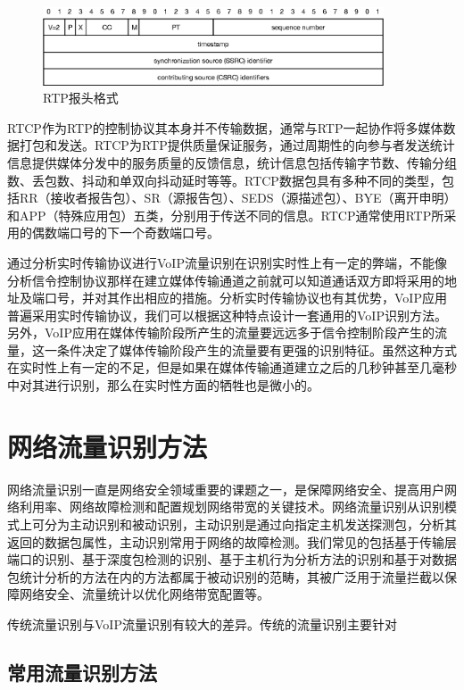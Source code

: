 \begin{figure}[thb]
\begin{center}
\includegraphics[width=0.9\textwidth]{figures/rtp.eps}
\caption{RTP报头格式}\label{fig:rtp}
\end{center}
\end{figure}

RTCP作为RTP的控制协议其本身并不传输数据，通常与RTP一起协作将多媒体数据打包和发送。RTCP为RTP提供质量保证服务，通过周期性的向参与者发送统计信息提供媒体分发中的服务质量的反馈信息，统计信息包括传输字节数、传输分组数、丢包数、抖动和单双向抖动延时等等。RTCP数据包具有多种不同的类型，包括RR（接收者报告包）、SR（源报告包）、SEDS（源描述包）、BYE（离开申明）和APP（特殊应用包）五类，分别用于传送不同的信息。RTCP通常使用RTP所采用的偶数端口号的下一个奇数端口号。

通过分析实时传输协议进行VoIP流量识别在识别实时性上有一定的弊端，不能像分析信令控制协议那样在建立媒体传输通道之前就可以知道通话双方即将采用的地址及端口号，并对其作出相应的措施。分析实时传输协议也有其优势，VoIP应用普遍采用实时传输协议，我们可以根据这种特点设计一套通用的VoIP识别方法。另外，VoIP应用在媒体传输阶段所产生的流量要远远多于信令控制阶段产生的流量，这一条件决定了媒体传输阶段产生的流量要有更强的识别特征。虽然这种方式在实时性上有一定的不足，但是如果在媒体传输通道建立之后的几秒钟甚至几毫秒中对其进行识别，那么在实时性方面的牺牲也是微小的。




\section{网络流量识别方法}
网络流量识别一直是网络安全领域重要的课题之一，是保障网络安全、提高用户网络利用率、网络故障检测和配置规划网络带宽的关键技术。网络流量识别从识别模式上可分为主动识别和被动识别，主动识别是通过向指定主机发送探测包，分析其返回的数据包属性，主动识别常用于网络的故障检测。我们常见的包括基于传输层端口的识别、基于深度包检测的识别、基于主机行为分析方法的识别和基于对数据包统计分析的方法在内的方法都属于被动识别的范畴，其被广泛用于流量拦截以保障网络安全、流量统计以优化网络带宽配置等。

传统流量识别与VoIP流量识别有较大的差异。传统的流量识别主要针对
\subsection{常用流量识别方法}

